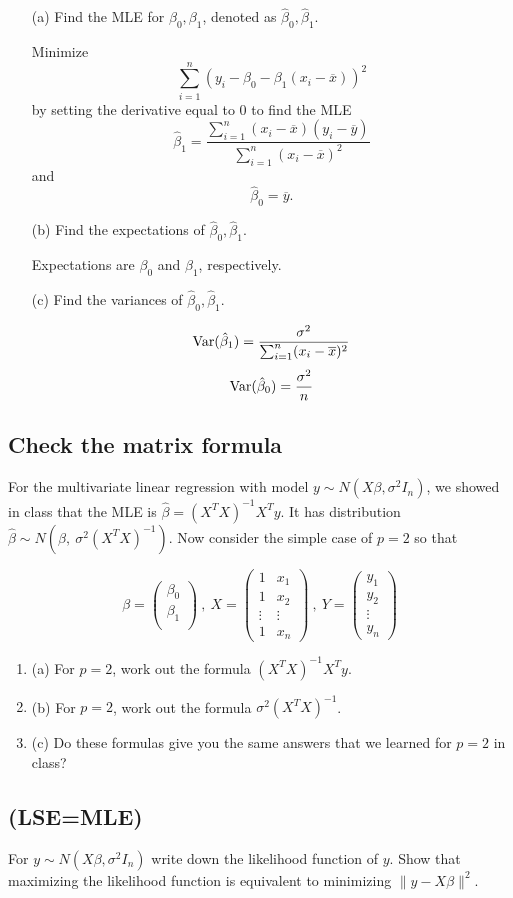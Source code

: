 \documentclass{tufte-book}
\begin{document}
\begin{enumerate}
\item[(a)] Find the MLE for $\beta_0, \beta_1$, denoted as $\hat{\beta}_0, \hat{\beta}_1$.

Minimize
\[ \sum_{i=1}^n(y_i - \beta_0 - \beta_1(x_i-\overline{x}))^2 \]
by setting the derivative equal to 0 to find the MLE
\[ \hat{\beta}_1 = \frac{\sum_{i=1}^n(x_i-\overline{x})(y_i-\overline{y})}{\sum_{i=1}^n(x_i-\overline{x})^2} \]
and
\[ \hat{\beta}_0 = \overline{y}.\]

\item[(b)] Find the expectations of $\hat{\beta}_0, \hat{\beta}_1$.

Expectations are $\beta_0$ and $\beta_1$, respectively.

\item[(c)] Find the variances of $\hat{\beta}_0, \hat{\beta}_1$.

\[ \operatorname{Var}(\hat{\beta}_1)=\frac{\sigma^2}{\sum_{i=1}^n(x_i-\overline{x})^2} \]
\[ \operatorname{Var}(\hat{\beta}_0)=\frac{\sigma^2}{n} \]
\end{enumerate}


\subsection{Check the matrix formula}  For the multivariate linear regression with model $y\sim N(X\beta, \sigma^2 I_n)$, we showed in class that the MLE is $\hat{\beta}=(X^TX)^{-1}X^Ty$. It has distribution $\hat{\beta} \sim N(\beta, \ \sigma^2(X^TX)^{-1})$.  Now consider the simple case of $p=2$ so that

\[ \beta=
\begin{pmatrix}
\beta_0 \\
\beta_1 \\
\end{pmatrix}
 \ , \ X =
\begin{pmatrix}
1 & x_1 \\
1 & x_2 \\
\vdots & \vdots \\
1 & x_n
\end{pmatrix}
\ , \ Y=
\begin{pmatrix}
y_1 \\
y_2 \\
\vdots \\
y_n
\end{pmatrix}
\]

\begin{enumerate}

\item{(a)} For $p=2$, work out the formula $(X^TX)^{-1}X^Ty$.

\item{(b)} For $p=2$, work out the formula $\sigma^2(X^TX)^{-1}$.

\item{(c)} Do these formulas give you the same answers that we learned for $p=2$ in class?

\end{enumerate}

\subsection{(LSE=MLE)} For $y \sim N(X\beta, \sigma^2 I_n)$ write down the likelihood function of $y$.  Show that maximizing the likelihood function is equivalent to minimizing $\|y-X\beta\|^2$.
\end{document}
